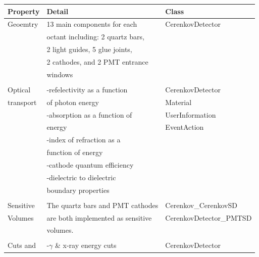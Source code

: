 \begin{table}
\begin{center}
\begin{tabular}{lll}
\hline 
 {\bf Property}          &  {\bf Detail}                     & {\bf Class}  \\
\hline 
 Geoemtry                &  13 main components for each      &  CerenkovDetector\\
                         &  octant including: 2 quartz bars, &  \\
                         &  2 light guides, 5 glue joints,   &  \\
                         &  2 cathodes, and 2 PMT entrance   &  \\
                         &  windows                          &  \\
                         &                                   &  \\ 
 Optical                 &  -refelectivity as a function     &  CerenkovDetector\\
 transport               &   of photon energy                &  Material\\ 
                         &  -absorption as a function of     &  UserInformation\\
                         &   energy                          &  EventAction\\
                         &  -index of refraction as a        &  \\
                         &   function of energy              &  \\
                         &  -cathode quantum efficiency      &  \\
                         &  -dielectric to dielectric        &  \\
                         &   boundary properties             &  \\
                         &                                   &  \\
 Sensitive               &  The quartz bars and PMT cathodes &  Cerenkov\_CerenkovSD    \\
 Volumes                 &  are both implemented as sensitive&  CerenkovDetector\_PMTSD \\
                         &   volumes.                        &  \\
                         &                                   &  \\
 Cuts and                &  -$\gamma$ \& x-ray energy cuts   &  CerenkovDetector        \\

\end{tabular}
\end{center}
\end{table}
